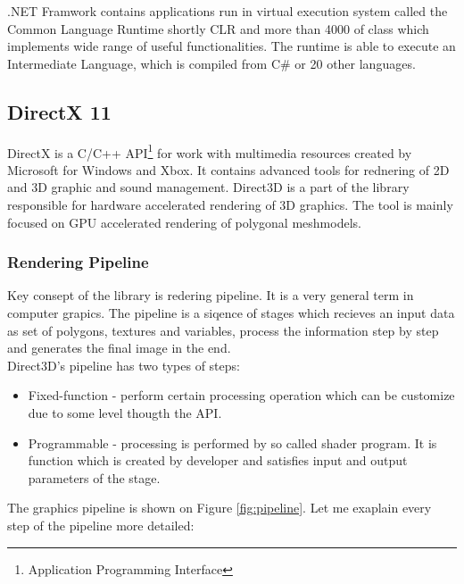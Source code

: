\documentclass[twoside, english, 11pt]{report}
\begin{document}
.NET Framwork contains applications run in virtual execution system called the Common Language Runtime shortly CLR and more than 4000 of class which implements wide range of useful functionalities. The runtime is able to execute an Intermediate Language, which is compiled from C\# or 20 other languages.
\subsection{DirectX 11}

DirectX is a C/C++ API\footnote{Application Programming Interface} for work with multimedia resources created by Microsoft for Windows and Xbox. It contains advanced tools for rednering of 2D and 3D graphic and sound management. Direct3D is a part of the library responsible for hardware accelerated rendering of 3D graphics. The tool is mainly focused on GPU accelerated rendering of polygonal meshmodels.\\

\subsubsection{Rendering Pipeline}
Key consept of the library is redering pipeline. It is a very general term in computer grapics. The pipeline is a siqence of stages which recieves an input data as set of polygons, textures and variables, process the information step by step and generates the final image in the end.\\

Direct3D's pipeline has two types of steps:
\begin{itemize}
\item Fixed-function - perform certain processing operation which can be customize due to some level thougth the API.
\item Programmable - processing is performed by so called shader program. It is function which is created by developer and satisfies input and output parameters of the stage.
\end{itemize}
 
The graphics pipeline is shown on Figure \ref{fig:pipeline}. Let me exaplain every step of the pipeline more detailed: 
\end{document}
